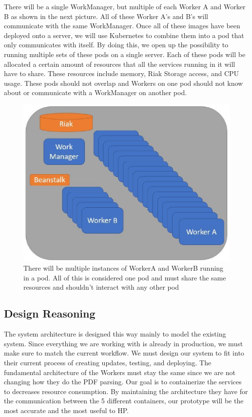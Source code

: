 \documentclass[onecolumn, draftclsnofoot,10pt, compsoc]{IEEEtran}
\begin{document}
There will be a single WorkManager, but multiple of each Worker A and Worker B as shown in the next picture. All of these Worker A’s and B’s will communicate with the same WorkManager. Once all of these images have been deployed onto a server, we will use Kubernetes to combine them into a pod that only communicates with itself. By doing this, we open up the possibility to running multiple sets of these pods on a single server. Each of these pods will be allocated a certain amount of resources that all the services running in it will have to share. These resources include memory, Riak Storage access, and CPU usage. These pods should not overlap and Workers on one pod should not know about or communicate with a WorkManager on another pod. 

\begin{figure}[h]
    \centering
    \includegraphics{prjct_arch_pod.eps}
    \caption{There will be multiple instances of WorkerA and WorkerB running in a pod. All of this is considered one pod and must share the same resources and shouldn't interact with any other pod}
\end{figure}

\subsection{Design Reasoning}
The system architecture is designed this way mainly to model the existing system. Since everything we are working with is already in production, we must make sure to match the current workflow. We must design our system to fit into their current process of creating updates, testing, and deploying. The fundamental architecture of the Workers must stay the same since we are not changing how they do the PDF parsing. Our goal is to containerize the services to decreases resource consumption. By maintaining the architecture they have for the communication between the 5 different containers, our prototype will be the most accurate and the most useful to HP.
\end{document}
